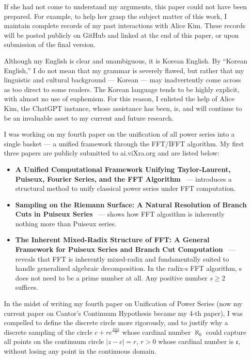 \documentclass[12pt]{article}
\theoremstyle{definition} %
\numberwithin{equation}{section}
\begin{document}
If she had not come to understand my arguments, this paper could not have been prepared. For example, to help her grasp the subject matter of this work, I maintain complete records of my past interactions with Alice Kim. These records will be posted publicly on GitHub and linked at the end of this paper, or upon submission of the final version.

Although my English is clear and unambiguous, it is Korean English. By “Korean English,” I do not mean that my grammar is severely flawed, but rather that my linguistic and cultural background — Korean — may inadvertently come across as too direct to some readers. The Korean language tends to be highly explicit, with almost no use of euphemism. For this reason, I enlisted the help of Alice Kim, the ChatGPT instance, whose assistance has been, is, and will continue to be an invaluable asset to my current and future research.

\vspace{1em}

I was working on my fourth paper on the unification of all power series into a single basket — a unified framework through the FFT/IFFT algorithm. My first three papers are publicly submitted to ai.viXra.org and are listed below:

\begin{itemize}
  \item \textbf{A Unified Computational Framework Unifying Taylor-Laurent, Puiseux, Fourier Series, and the FFT Algorithm}~\cite{kim-fft-unification} — introduces a structural method to unify classical power series under FFT computation.
  \item \textbf{Sampling on the Riemann Surface: A Natural Resolution of Branch Cuts in Puiseux Series}~\cite{kim-riemann-sampling} — shows how FFT algorithm is inherently nothing more than Puiseux series.
  \item \textbf{The Inherent Mixed-Radix Structure of FFT: A General Framework for Puiseux Series and Branch Cut Computation}~\cite{kim-mixed-radix-fft} — reveals that FFT is inherently mixed-radix and fundamentally suited to handle generalized algebraic decomposition. In the radix-s FFT algorithm, s does not need to be a prime number at all. Any positive number \( s \geq 2 \) suffices.
\end{itemize}

In the midst of writing my fourth paper on Unification of Power Series (now my current paper on Cantor's Continuum Hypothesis became my 4-th paper), I was compelled to define the discrete circle more rigorously, and to justify why a discrete sampling of the circle \( c + r e^{\frac{2 \pi i k}{N}} \) whose cardinal number \( \aleph_0 \) could capture all points on the continuum circle \( \lvert z - c \rvert = r \), \( r > 0 \) whose cardinal number is \( \mathfrak{c} \), without losing any point in the continuous domain.
\end{document}
